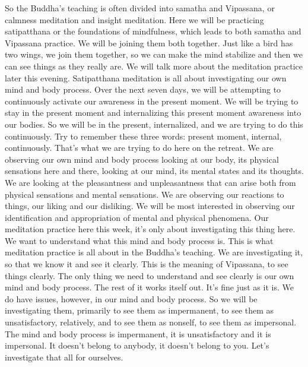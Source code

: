 \documentclass[letterpaper,10pt,english]{sphinxmanual}
\begin{document}
\sphinxAtStartPar
So the Buddha’s teaching is often divided into samatha and Vipassana,
or calmness meditation and insight meditation. Here we will be practicing
satipatthana or the foundations of mindfulness, which leads to both samatha
and Vipassana practice. We will be joining them both together. Just like a
bird has two wings, we join them together, so we can make the mind stabilize and then we can see things as they really are. We will talk more about the
meditation  practice  later  this  evening.  Satipatthana  meditation  is  all  about
investigating  our  own  mind  and  body  process.  Over  the  next  seven  days,
we will be attempting to continuously activate our awareness in the present
   moment. We will be trying to stay in the present moment and internalizing
this present moment awareness into our bodies. So we will be in the present, internalized, and we are trying to do this continuously. Try to remember
these three words: present moment, internal, continuously. That’s what we
are  trying  to  do  here  on  the  retreat.  We  are  observing  our  own  mind  and
body  process  looking  at  our  body,  its  physical  sensations  here  and  there,
looking at our mind, its mental states and its thoughts. We are looking at the
pleasantness and unpleasantness that can arise both from physical sensations
and mental sensations. We are observing our reactions to things, our liking
and  our  disliking.  We  will  be  most  interested  in  observing  our  identification and appropriation of mental and physical phenomena. Our meditation
practice here this week, it’s only about investigating this thing here. We want
to understand what this mind and body process is. This is what meditation
practice  is  all  about  in  the  Buddha’s  teaching.  We  are  investigating  it,  so
that we know it and see it clearly. This is the meaning of Vipassana, to see
things clearly. The only thing we need to understand and see clearly is our
own mind and body process. The rest of it works itself out. It’s fine just as
it is. We do have issues, however, in our mind and body process. So we will
be investigating them, primarily to see them as impermanent, to see them as
unsatisfactory, relatively, and to see them as non\sphinxhyphen{}self, to see them as impersonal. The mind and body process is impermanent, it is unsatisfactory and
it is impersonal. It doesn’t belong to anybody, it doesn’t belong to you. Let’s
investigate that all for ourselves.
\end{document}
